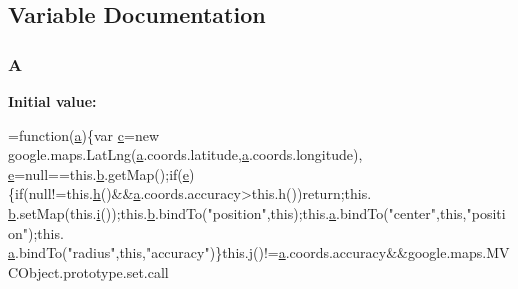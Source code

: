 \subsection{Variable Documentation}
\subsubsection[{\texorpdfstring{A}{A}}]{ A}\hypertarget{geolocation-marker_8js_ae98db78756395effc51252e2297bf39b}{}\label{geolocation-marker_8js_ae98db78756395effc51252e2297bf39b}
{\bfseries Initial value\+:}
\begin{DoxyCode}
=\textcolor{keyword}{function}(\hyperlink{packages_2bootstrap_83_83_86_2content_2_scripts_2bootstrap_8min_8js_ae8f6b400ed3390908c5cdeebed3a82b9}{a})\{var \hyperlink{geolocation-marker_8js_a86bf90f74f091767cf1ae2e64e46fea2}{c}=\textcolor{keyword}{new} google.maps.LatLng(\hyperlink{packages_2bootstrap_83_83_86_2content_2_scripts_2bootstrap_8min_8js_ae8f6b400ed3390908c5cdeebed3a82b9}{a}.coords.latitude,\hyperlink{packages_2bootstrap_83_83_86_2content_2_scripts_2bootstrap_8min_8js_ae8f6b400ed3390908c5cdeebed3a82b9}{a}.coords.longitude),
      \hyperlink{packages_2bootstrap_83_83_86_2content_2_scripts_2bootstrap_8min_8js_ab5902775854a8b8440bcd25e0fe1c120}{e}=null==this.\hyperlink{geolocation-marker_8js_a21ad0bd836b90d08f4cf640b4c298e7c}{b}.getMap();\textcolor{keywordflow}{if}(\hyperlink{packages_2bootstrap_83_83_86_2content_2_scripts_2bootstrap_8min_8js_ab5902775854a8b8440bcd25e0fe1c120}{e})\{\textcolor{keywordflow}{if}(null!=this.\hyperlink{geolocation-marker_8js_a7d9295d5021b819dbc38a41df84a0491}{h}()&&\hyperlink{packages_2bootstrap_83_83_86_2content_2_scripts_2bootstrap_8min_8js_ae8f6b400ed3390908c5cdeebed3a82b9}{a}.coords.accuracy>\textcolor{keyword}{this}.h())\textcolor{keywordflow}{return};this.
      \hyperlink{geolocation-marker_8js_a21ad0bd836b90d08f4cf640b4c298e7c}{b}.setMap(this.\hyperlink{geolocation-marker_8js_a0325b7ce0988782a8032e720ef3aa411}{i}());this.\hyperlink{geolocation-marker_8js_a21ad0bd836b90d08f4cf640b4c298e7c}{b}.bindTo(\textcolor{stringliteral}{"position"},\textcolor{keyword}{this});this.\hyperlink{packages_2bootstrap_83_83_86_2content_2_scripts_2bootstrap_8min_8js_ae8f6b400ed3390908c5cdeebed3a82b9}{a}.bindTo(\textcolor{stringliteral}{"center"},\textcolor{keyword}{this},\textcolor{stringliteral}{"position"});this.
      \hyperlink{packages_2bootstrap_83_83_86_2content_2_scripts_2bootstrap_8min_8js_ae8f6b400ed3390908c5cdeebed3a82b9}{a}.bindTo(\textcolor{stringliteral}{"radius"},\textcolor{keyword}{this},\textcolor{stringliteral}{"accuracy"})\}this.\hyperlink{geolocation-marker_8js_af0ba8fb208a5f5ab73eb0859811a23f8}{j}()!=\hyperlink{packages_2bootstrap_83_83_86_2content_2_scripts_2bootstrap_8min_8js_ae8f6b400ed3390908c5cdeebed3a82b9}{a}.coords.accuracy&&google.maps.MVCObject.prototype.set.call

\end{DoxyCode}
